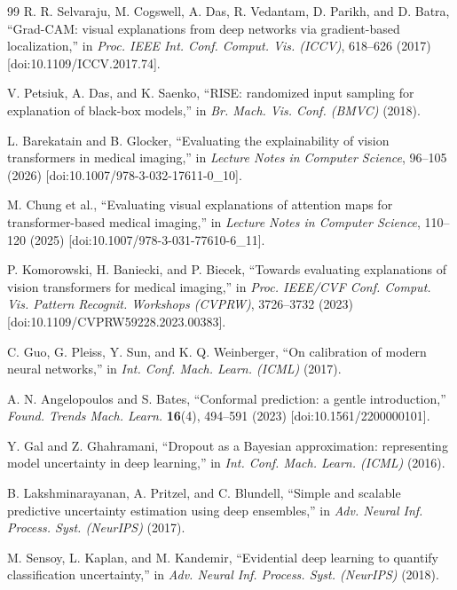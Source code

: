 \documentclass[12pt,letterpaper]{article}
\begin{document}
{\begin{thebibliography}{99}
R. R. Selvaraju, M. Cogswell, A. Das, R. Vedantam, D. Parikh, and D. Batra, ``Grad-CAM: visual explanations from deep networks via gradient-based localization,'' in \textit{Proc. IEEE Int. Conf. Comput. Vis. (ICCV)}, 618--626 (2017) [doi:10.1109/ICCV.2017.74].

V. Petsiuk, A. Das, and K. Saenko, ``RISE: randomized input sampling for explanation of black-box models,'' in \textit{Br. Mach. Vis. Conf. (BMVC)} (2018).

L. Barekatain and B. Glocker, ``Evaluating the explainability of vision transformers in medical imaging,'' in \textit{Lecture Notes in Computer Science}, 96--105 (2026) [doi:10.1007/978-3-032-17611-0\_10].

M. Chung et al., ``Evaluating visual explanations of attention maps for transformer-based medical imaging,'' in \textit{Lecture Notes in Computer Science}, 110--120 (2025) [doi:10.1007/978-3-031-77610-6\_11].

P. Komorowski, H. Baniecki, and P. Biecek, ``Towards evaluating explanations of vision transformers for medical imaging,'' in \textit{Proc. IEEE/CVF Conf. Comput. Vis. Pattern Recognit. Workshops (CVPRW)}, 3726--3732 (2023) [doi:10.1109/CVPRW59228.2023.00383].

C. Guo, G. Pleiss, Y. Sun, and K. Q. Weinberger, ``On calibration of modern neural networks,'' in \textit{Int. Conf. Mach. Learn. (ICML)} (2017).

A. N. Angelopoulos and S. Bates, ``Conformal prediction: a gentle introduction,'' \textit{Found. Trends Mach. Learn.} \textbf{16}(4), 494--591 (2023) [doi:10.1561/2200000101].

Y. Gal and Z. Ghahramani, ``Dropout as a Bayesian approximation: representing model uncertainty in deep learning,'' in \textit{Int. Conf. Mach. Learn. (ICML)} (2016).

B. Lakshminarayanan, A. Pritzel, and C. Blundell, ``Simple and scalable predictive uncertainty estimation using deep ensembles,'' in \textit{Adv. Neural Inf. Process. Syst. (NeurIPS)} (2017).

M. Sensoy, L. Kaplan, and M. Kandemir, ``Evidential deep learning to quantify classification uncertainty,'' in \textit{Adv. Neural Inf. Process. Syst. (NeurIPS)} (2018).


\end{thebibliography}}
\end{document}
